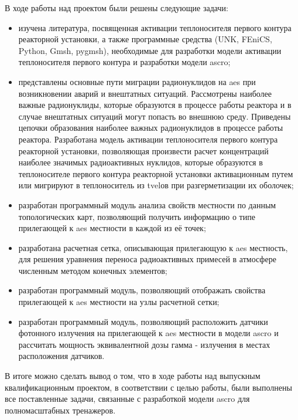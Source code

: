 В ходе работы над проектом были решены следующие задачи:
\begin{itemize}
	\item изучена литература, посвященная активации теплоносителя первого контура реакторной установки, а также 
	программные средства (UNK, FEniCS, Python, Gmsh, pygmsh), необходимые для разработки модели активации теплоносителя 
	первого контура и разработки модели \ac{ascro};
	\item представлены основные пути миграции радионуклидов на \ac{aes} при возникновении аварий и внештатных ситуаций. 
	Рассмотрены наиболее важные радионуклиды, которые образуются в процессе работы реактора и в случае внештатных 
	ситуаций могут попасть во внешнюю среду. Приведены цепочки образования наиболее важных радионуклидов в процессе 
	работы реактора. Разработана модель активации теплоносителя первого контура реакторной установки, позволяющая 
	произвести расчет концентраций наиболее значимых радиоактивных нуклидов, которые образуются в теплоносителе первого 
	контура реакторной установки активационным путем или мигрируют в теплоноситель из \ac{tvel}ов при разгерметизации 
	их оболочек;
	\item разработан программный модуль анализа свойств местности по данным топологических карт, позволяющий получить 
	информацию о типе прилегающей к \ac{aes} местности в каждой из её точек;
	\item разработана расчетная сетка, описывающая прилегающую к \ac{aes} местность, для решения уравнения переноса 
	радиоактивных примесей в атмосфере численным методом конечных элементов;
	\item разработан программный модуль, позволяющий отображать свойства прилегающей к \ac{aes} местности на узлы 
	расчетной сетки;
	\item разработан программный модуль, позволяющий расположить датчики фотонного излучения на прилегающей к \ac{aes} 
	местности в модели \ac{ascro} и рассчитать мощность эквивалентной дозы гамма - излучения в местах расположения 
	датчиков.
\end{itemize}

В итоге можно сделать вывод о том, что в ходе работы над выпускным квалификационным проектом, в соответствии с целью 
работы, были выполнены все поставленные задачи, связанные с разработкой модели \ac{ascro} для полномасштабных тренажеров.
